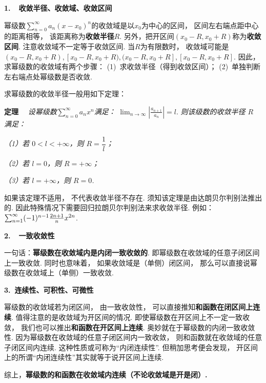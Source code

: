 \textbf{1.~~收敛半径、收敛域、收敛区间}\vspace{0.5em}

幂级数$\sum_{n=0}^{\infty} a_n (x-x_0)^n$的收敛域是以$x_0$为中心的区间，
区间左右端点距中心的距离相等，
该距离称为\textbf{收敛半径}$R$.
另外，把开区间$(x_0 - R, x_0+R)$称为\textbf{收敛区间}.
注意收敛域不一定等于收敛区间.
当$R$为有限数时，
收敛域可能是$(x_0 - R, x_0+R),[x_0 - R, x_0+R),(x_0 - R, x_0+R],[x_0 - R, x_0+R]$.
因此，求幂级数的收敛域有两个步骤：
(1)~求收敛半径（得到收敛区间）；
(2)~单独判断左右端点处幂级数是否收敛.

求幂级数的收敛半径一般用如下定理：\vspace{1em}

\textbf{定理}~~
\textit{设幂级数$\sum_{n=0}^{\infty} a_n x^n$满足：}
$\lim_{n\to\infty}\left|\frac{a_{n+1}}{a_n}\right|=l$.
\textit{则该级数的收敛半径 $R$ 满足：}

\textit{（1）若 $0<l<+\infty$，则 $R=\dfrac{1}{l}$；}

\textit{（2）若 $l=0$，则 $R=+\infty$；}

\textit{（3）若 $l=+\infty$，则 $R=0$.}\vspace{1em}

如果该定理不适用，
不代表收敛半径不存在.
须知该定理是由达朗贝尔判别法推出的.
因此特殊情况下需要回归拉朗贝尔判别法来求收敛半径.
例如：$\ss (-1)^{n-1}\frac{2n+1}{n}x^{2n}$.\vspace{1em}

\textbf{2.~~一致收敛性}\vspace{0.25em}

一句话：\textbf{幂级数在收敛域内是内闭一致收敛的}.
即幂级数在收敛域的任意子闭区间上一致收敛.
同时也意味着，
如果收敛域是（单侧）闭区间，
那么可以直接说幂级数在收敛域上（单侧）一致收敛.\vspace{1em}

\textbf{3.~连续性、可积性、可微性}\vspace{0.25em}

幂级数的收敛域若为闭区间，
由一致收敛性，
可以直接推知\textbf{和函数在闭区间上连续}.
值得注意的是收敛域为开区间的情况.
即使幂级数在开区间上不一定一致收敛，
我们也可以推出\textbf{和函数在开区间上连续}.
奥妙就在于幂级数的内闭一致收敛性.
因为幂级数在收敛域的任意子闭区间内一致收敛，
则和函数就在收敛域的任意子闭区间内连续.
这种性质或可称为“内闭连续性”.
但稍加思考便会发现，
开区间上的所谓“内闭连续性”其实就等于说开区间上连续.

综上，\textbf{幂级数的和函数在收敛域内连续（不论收敛域是开是闭）.}

